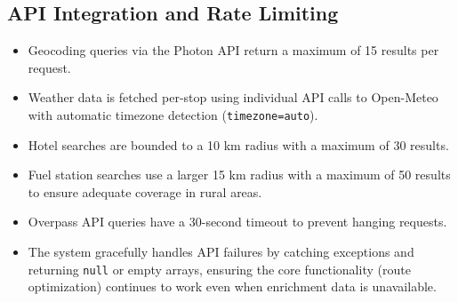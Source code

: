 \subsection{API Integration and Rate Limiting}
\begin{itemize}
    \item Geocoding queries via the Photon API return a maximum of 15 results per request.
    \item Weather data is fetched per-stop using individual API calls to Open-Meteo with automatic timezone detection (\texttt{timezone=auto}).
    \item Hotel searches are bounded to a 10 km radius with a maximum of 30 results.
    \item Fuel station searches use a larger 15 km radius with a maximum of 50 results to ensure adequate coverage in rural areas.
    \item Overpass API queries have a 30-second timeout to prevent hanging requests.
    \item The system gracefully handles API failures by catching exceptions and returning \texttt{null} or empty arrays, ensuring the core functionality (route optimization) continues to work even when enrichment data is unavailable.
\end{itemize}

\newpage
